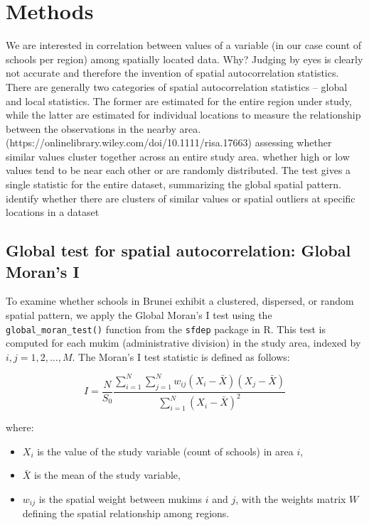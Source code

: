 \documentclass[12pt]{article}
\begin{document}
\section{Methods}
We are interested in correlation between values of a variable (in our case count of schools per region) among spatially located data. Why? Judging by eyes is clearly not accurate and therefore the invention of spatial autocorrelation statistics. There are generally two categories of spatial autocorrelation statistics – global and local statistics. The former are estimated for the entire region under study, while the latter are estimated for individual locations to measure the relationship between the observations in the nearby area. (https://onlinelibrary.wiley.com/doi/10.1111/risa.17663)
assessing whether similar values cluster together across an entire study area. whether high or low values tend to be near each other or are randomly distributed. The test gives a single statistic for the entire dataset, summarizing the global spatial pattern.
identify whether there are clusters of similar values or spatial outliers at specific locations in a dataset


\subsection{Global test for spatial autocorrelation: Global Moran's I}
To examine whether schools in Brunei exhibit a clustered, dispersed, or random spatial pattern, we apply the Global Moran’s I test using the \texttt{global\_moran\_test()} function from the \texttt{sfdep} package in R. This test is computed for each mukim (administrative division) in the study area, indexed by \( i, j = 1, 2, \dots, M \). The Moran’s I test statistic is defined as follows: 

\begin{equation}
I = \frac{N}{S_0} \frac{\sum_{i=1}^N \sum_{j=1}^N w_{ij} (X_i - \bar{X})(X_j - \bar{X})}{\sum_{i=1}^N (X_i - \bar{X})^2}
\end{equation}

where:
\begin{itemize}
    \item \( X_i \) is the value of the study variable (count of schools) in area \( i \),
    \item \( \bar{X} \) is the mean of the study variable,
    \item \( w_{ij} \) is the spatial weight between mukims \( i \) and \( j \), with the weights matrix \( W \) defining the spatial relationship among regions.
\end{itemize}
\end{document}
